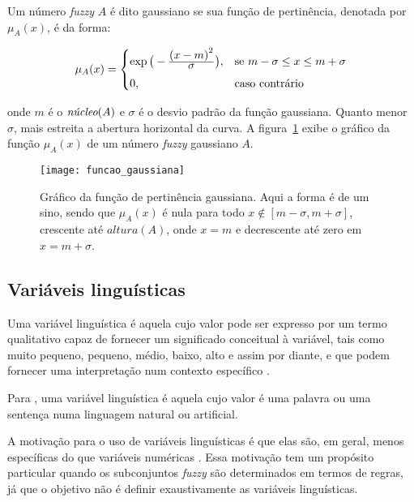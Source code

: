 \begin{defn}
\label{def:funcao_fuzzy_gaussiana}
Um número \emph{fuzzy} $A$ é dito gaussiano se sua função de pertinência, denotada por $\mu_{A}(x)$, é da forma:

\begin{equation}
  \mu_A(x) =  \begin{cases}
                \exp{\big(-\ensuremath{\frac{\displaystyle {(x - m)}^2}{\displaystyle \sigma}} \big)}, & \text{se}\ m - \sigma \leq x \leq m + \sigma\\[0.5em]
                0, & \text{caso contrário}
              \end{cases}
\end{equation}
\end{defn}
\noindent onde $m$ é o $\emph{núcleo}(A)$ e $\sigma$ é o desvio padrão da função gaussiana. Quanto menor $\sigma$, mais estreita a abertura horizontal da curva. A figura~\ref{fig:funcao_fuzzy_gaussiana} exibe o gráfico da função $\mu_A(x)$ de um número \emph{fuzzy} gaussiano $A$.

\begin{figure}[!h]
  \centering
  \texttt{[image: funcao\_gaussiana]}
  \caption[Gráfico da função de pertinência gaussiana]{Gráfico da função de pertinência gaussiana. Aqui a forma é de um sino, sendo que $\mu_A(x)$ é nula para todo $x \notin [m - \sigma, m + \sigma]$, crescente  até $altura(A)$, onde $x = m$ e decrescente até zero em $x = m + \sigma$.}
  \label{fig:funcao_fuzzy_gaussiana}
\end{figure}


\subsection{Variáveis linguísticas}
\label{sec:variaveis_linguisticas}
Uma variável linguística é aquela cujo valor pode ser expresso por um termo qualitativo capaz de fornecer um significado conceitual à variável, tais como muito pequeno, pequeno, médio, baixo, alto e assim por diante, e que podem fornecer uma interpretação num contexto específico \citep{pedrycz:98}.

Para \citet{zadeh:75}, uma variável linguística é aquela cujo valor é uma palavra ou uma sentença numa linguagem natural ou artificial.

A motivação para o uso de variáveis linguísticas é que elas são, em geral, menos específicas do que variáveis numéricas \citep{zadeh:75}. Essa motivação tem um propósito particular quando os subconjuntos \emph{fuzzy} são determinados em termos de regras, já que o objetivo não é definir exaustivamente as variáveis linguísticas.


